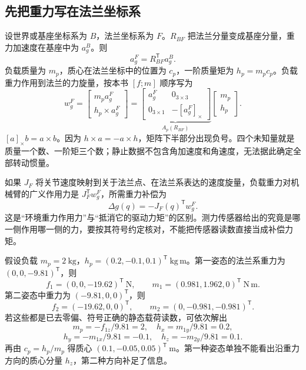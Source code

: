 \subsection{先把重力写在法兰坐标系}
设世界或基座坐标系为 $B$，法兰坐标系为 $F$。$R_{BF}$ 把法兰分量变成基座分量，重力加速度在基座中为 $a_g^B$。则
\[
 a_g^F=R_{BF}^{\mathsf T}a_g^B.
\]
负载质量为 $m_p$，质心在法兰坐标中的位置为 $c_p$，一阶质量矩为 $h_p=m_pc_p$。负载重力作用到法兰的力旋量，按本书 $[f;m]$ 顺序写为
\begin{equation}
 w_g^F=\begin{bmatrix}m_pa_g^F\\h_p\times a_g^F\end{bmatrix}
 =\underbrace{\begin{bmatrix}a_g^F&0_{3\times3}\\0_{3\times1}&-[a_g^F]_\times\end{bmatrix}}_{A_p(R_{BF})}
 \begin{bmatrix}m_p\\h_p\end{bmatrix}.
\end{equation}
$[a]_\times b=a\times b$。因为 $h\times a=-a\times h$，矩阵下半部分出现负号。四个未知量就是质量一个数、一阶矩三个数；静止数据不包含角加速度和角速度，无法据此确定全部转动惯量。

如果 $J_F$ 将关节速度映射到关于法兰点、在法兰系表达的速度旋量，负载重力对机械臂的广义作用力是 $J_F^{\mathsf T}w_g^F$，所需重力补偿为
\begin{equation}
 \Delta g(q)=-J_F(q)^{\mathsf T}w_g^F.
\end{equation}
这是“环境重力作用力”与“抵消它的驱动力矩”的区别。测力传感器给出的究竟是哪一侧作用哪一侧的力，要按其符号约定核对，不能把传感器读数直接当成补偿力矩。

\begin{examplebox}[算例 10A 两种方向就能看出一阶质量矩的作用]
假设负载 $m_p=2\ \mathrm{kg}$，$h_p=(0.2,-0.1,0.1)^{\mathsf T}\ \mathrm{kg\,m}$。第一姿态的法兰系重力为 $(0,0,-9.81)^{\mathsf T}$，则
\[
 f_1=(0,0,-19.62)^{\mathsf T}\ \mathrm N,\qquad
 m_1=(0.981,1.962,0)^{\mathsf T}\ \mathrm{N\,m}.
\]
第二姿态中重力为 $(-9.81,0,0)^{\mathsf T}$，则
\[
 f_2=(-19.62,0,0)^{\mathsf T},\qquad m_2=(0,-0.981,-0.981)^{\mathsf T}.
\]
若这些都是已去零偏、符号正确的静态载荷读数，可依次解出
\[
 m_p=-f_{1z}/9.81=2,\quad h_x=m_{1y}/9.81=0.2,
\]
\[
 h_y=-m_{1x}/9.81=-0.1,\quad h_z=-m_{2y}/9.81=0.1.
\]
再由 $c_p=h_p/m_p$ 得质心 $(0.1,-0.05,0.05)^{\mathsf T}\ \mathrm m$。第一种姿态单独不能看出沿重力方向的质心分量 $h_z$，第二种方向补足了信息。
\end{examplebox}

